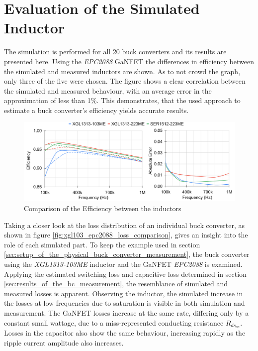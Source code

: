 \section{Evaluation of the Simulated Inductor}
The simulation is performed for all 20 buck converters and its results are presented here. Using the \textit{EPC2088} \ac{GaNFET} the differences in efficiency between the simulated and measured inductors are shown. As to not crowd the graph, only three of the five were chosen. The figure shows a clear correlation between the simulated and measured behaviour, with an average error in the approximation of less than 1\%. This demonstrates, that the used approach to estimate a buck converter's efficiency yields accurate results. 
\begin{figure}[H]
    \centering
    \includegraphics[width=1\linewidth]{Bilder//Kapitel4/EPC2088_Inductor_Efficiency_Comparison.png}
    \caption{Comparison of the Efficiency between the inductors}
    \label{fig:comparison_of_the_efficiency}
\end{figure}
Taking a closer look at the loss distribution of an individual buck converter, as shown in figure \ref{fig:xgl103_epc2088_loss_comparison}, gives an insight into the role of each simulated part. To keep the example used in section \ref{sec:setup_of_the_physical_buck_converter_measurement}, the buck converter using the \textit{XGL1313-103ME} inductor and the \ac{GaNFET} \textit{EPC2088} is examined. Applying the estimated switching loss and capacitive loss determined in section \ref{sec:results_of_the_bc_measurement}, the resemblance of simulated and measured losses is apparent. 
Observing the inductor, the simulated increase in the losses at low frequencies due to saturation is visible in both simulation and measurement. The \ac{GaNFET} losses increase at the same rate, differing only by a constant small wattage, due to a miss-represented conducting resistance $R_{ds_{on}}$. Losses in the capacitor also show the same behaviour, increasing rapidly as the ripple current amplitude also increases.\\ 
